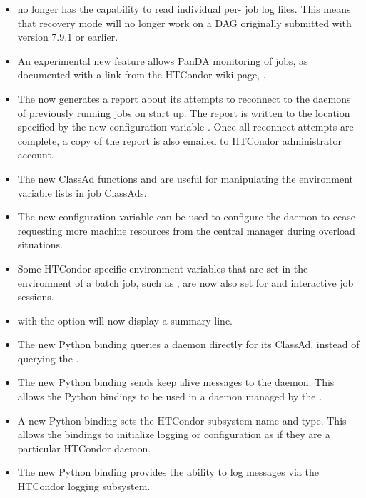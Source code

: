 \begin{itemize}
\item {} no longer has the capability to read individual per-
job log files.  This means that recovery mode will no longer work on a
DAG originally submitted with version 7.9.1 or earlier.

\item An experimental new feature allows PanDA monitoring of jobs,
as documented with a link from the HTCondor wiki page,
.

\item The  now generates a report about its attempts to
reconnect to the  daemons of previously running jobs on start up.
The report is written to the location specified by the new configuration
variable .
Once all reconnect attempts are complete, a copy of the report is also
emailed to HTCondor administrator account.

\item The new ClassAd functions  and 
 are
useful for manipulating the environment variable lists in job ClassAds.

\item The new configuration variable 
can be used to configure the  daemon
 to cease requesting more machine resources
from the central manager during overload situations.

\item Some HTCondor-specific environment variables that are set in the
environment of a batch job, such as ,
 are now also set for
 and interactive job sessions.

\item {} with the  option will now display
a summary line.

\item The new  Python binding queries a daemon
directly for its ClassAd, 
instead of querying the .

\item The new  Python binding sends keep alive
messages to the  daemon. This allows the Python bindings to be
used in a daemon managed by the .

\item A new Python binding sets the HTCondor subsystem name and type.
This allows the bindings to initialize logging or configuration as if they
are a particular HTCondor daemon.

\item The new  Python binding provides the ability
 to log messages via the HTCondor logging subsystem.

\end{itemize}

